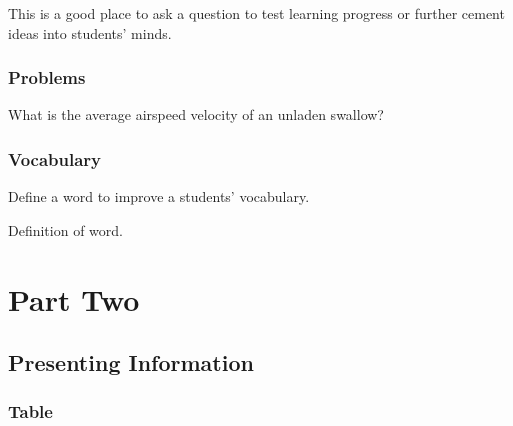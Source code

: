 \documentclass[11pt,fleqn,a5paper]{book} %
\begin{document}
    \begin{exercise}
    This is a good place to ask a question to test learning progress or further cement ideas into students' minds.
    \end{exercise}
    
    
    \section{Problems}
    
    \begin{problem}
    What is the average airspeed velocity of an unladen swallow?
    \end{problem}
    
    
    \section{Vocabulary}
    
    Define a word to improve a students' vocabulary.
    
    \begin{vocabulary}[Word]
    Definition of word.
    \end{vocabulary}
    
    
    \part{Part Two}
    
    
    
    \chapter{Presenting Information}
    
    \section{Table}
    
\end{document}

